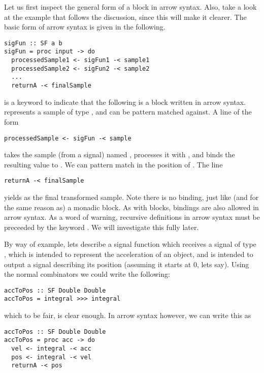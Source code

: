 Let us first inspect the general form of a block in arrow syntax. Also, take a look at the example that follows the discussion, since this will make it clearer. The basic form of arrow syntax is given in the following.

\begin{lstlisting}
sigFun :: SF a b
sigFun = proc input -> do
  processedSample1 <- sigFun1 -< sample1
  processedSample2 <- sigFun2 -< sample2
  ...
  returnA -< finalSample
\end{lstlisting}

 is a keyword to indicate that the following is a block written in arrow syntax.  represents a sample of type , and can be pattern matched against. A line of the form

\begin{lstlisting}
processedSample <- sigFun -< sample
\end{lstlisting}

\noindent takes the sample (from a signal) named , processes it with , and binds the resulting value to . We can pattern match in the position of . The line

\begin{lstlisting}
returnA -< finalSample
\end{lstlisting}

\noindent yields  as the final transformed sample. Note there is no binding, just like (and for the same reason as) a monadic  block. As with  blocks,  bindings are also allowed in arrow syntax. As a word of warning, recursive definitions in arrow syntax must be preceeded by the keyword . We will investigate this fully later.

By way of example, lets describe a signal function which receives a signal of type , which is intended to represent the acceleration of an object, and is intended to output a signal describing its position (assuming it starts at $0$, lets say). Using the normal combinators we could write the following:

\begin{lstlisting}
accToPos :: SF Double Double
accToPos = integral >>> integral
\end{lstlisting}

\noindent which to be fair, is clear enough. In arrow syntax however, we can write this as

\begin{lstlisting}
accToPos :: SF Double Double
accToPos = proc acc -> do
  vel <- integral -< acc
  pos <- integral -< vel
  returnA -< pos
\end{lstlisting}

